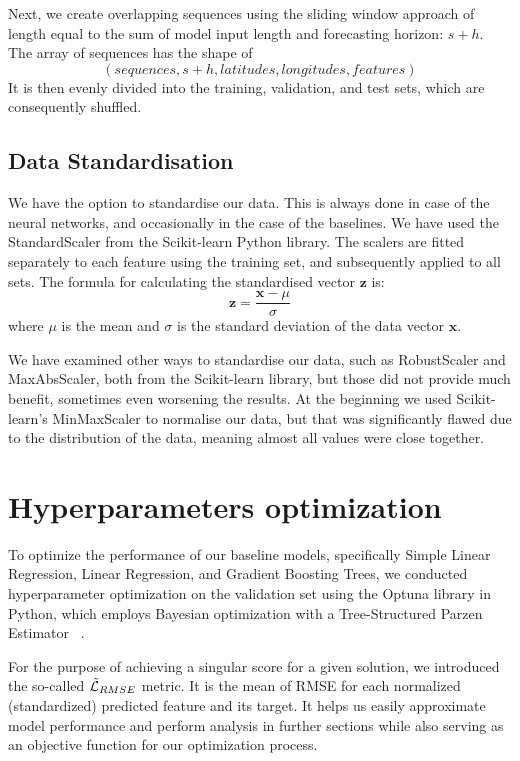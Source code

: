 Next, we create overlapping sequences using the sliding window approach of length equal to the sum of model input length and forecasting horizon: $s + h$. The array of sequences has the shape of 
\[
    (sequences, s+h, latitudes, longitudes, features)
\] 
It is then evenly divided into the training, validation, and test sets, which are consequently shuffled.

\subsection{Data Standardisation}
We have the option to standardise our data. This is always done in case of the neural networks, and occasionally in the case of the baselines. We have used the StandardScaler from the Scikit-learn \cite{scikit-learn} Python library. The scalers are fitted separately to each feature using the training set, and subsequently applied to all sets. The formula for calculating the standardised vector $\mathbf{z}$ is:
\[
    \mathbf{z} = \frac{\mathbf{x} - \mu}{\sigma}
\]
where $\mu$ is the mean and $\sigma$ is the standard deviation of the data vector $\mathbf{x}$.

We have examined other ways to standardise our data, such as RobustScaler and MaxAbsScaler, both from the Scikit-learn library, but those did not provide much benefit, sometimes even worsening the results. At the beginning we used Scikit-learn's MinMaxScaler to normalise our data, but that was significantly flawed due to the distribution of the data, meaning almost all values were close together.

\section{Hyperparameters optimization} \label{chap:hpo}

To optimize the performance of our baseline models, specifically Simple Linear Regression, Linear Regression, and Gradient Boosting Trees, we conducted hyperparameter optimization on the validation set using the Optuna library in Python, which employs Bayesian optimization \cite{snoek2012practical} with a Tree-Structured Parzen Estimator ~\cite{watanabe2023treestructured}.

For the purpose of achieving a singular score for a given solution, we introduced the so-called $\Tilde{\mathcal{L}}_{RMSE}$ metric. It is the mean of RMSE for each normalized (standardized) predicted feature and its target. It helps us easily approximate model performance and perform analysis in further sections while also serving as an objective function for our optimization process.

